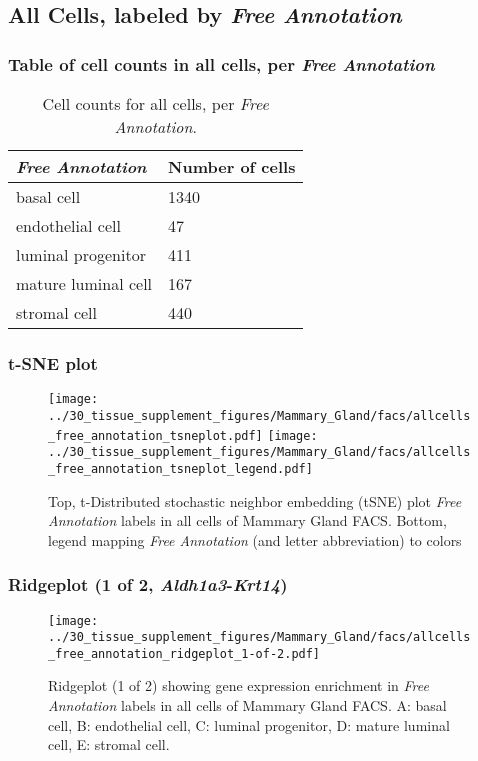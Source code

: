 \clearpage

\subsection{All Cells, labeled by \emph{Free Annotation}}
\subsubsection{Table of cell counts in all cells, per \emph{Free Annotation}}\begin{table}[h]
\centering
\label{my-label}
\begin{tabular}{@{}ll@{}}
\toprule

\emph{Free Annotation}& Number of cells \\ \midrule
basal cell & 1340 \\

endothelial cell & 47 \\

luminal progenitor & 411 \\

mature luminal cell & 167 \\

stromal cell & 440 \\
\bottomrule
\end{tabular}
\caption{Cell counts for all cells, per \emph{Free Annotation}.}
\end{table}

\clearpage
\subsubsection{t-SNE plot}
\begin{figure}[h]
\centering
\texttt{[image: ../30\_tissue\_supplement\_figures/Mammary\_Gland/facs/allcells\_free\_annotation\_tsneplot.pdf]}
\texttt{[image: ../30\_tissue\_supplement\_figures/Mammary\_Gland/facs/allcells\_free\_annotation\_tsneplot\_legend.pdf]}
\caption{Top, t-Distributed stochastic neighbor embedding (tSNE) plot  \emph{Free Annotation} labels in all cells of Mammary Gland FACS. Bottom, legend mapping \emph{Free Annotation} (and letter abbreviation) to colors}
\end{figure}


\clearpage

\subsubsection{Ridgeplot (1 of 2, \emph{Aldh1a3}-\emph{Krt14})}
\begin{figure}[h]
\centering
\texttt{[image: ../30\_tissue\_supplement\_figures/Mammary\_Gland/facs/allcells\_free\_annotation\_ridgeplot\_1-of-2.pdf]}

\caption{ Ridgeplot (1 of 2)  showing gene expression enrichment in \emph{Free Annotation} labels in all cells of Mammary Gland FACS. A: basal cell, B: endothelial cell, C: luminal progenitor, D: mature luminal cell, E: stromal cell.}
\end{figure}


